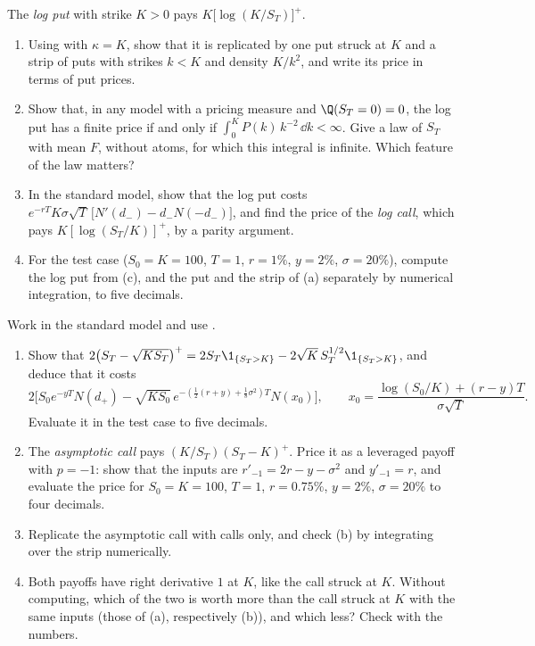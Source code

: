 \begin{exercise}\label{ex:sr-log-put}
\medium The \emph{log put} with strike $K>0$ pays $K\big[\log(K/S_T)\big]^+$.
\begin{enumerate}[label=(\alph*)]
  \item Using  with $\kappa=K$, show that it is replicated by one put struck at $K$ and
    a strip of puts with strikes $k<K$ and density $K/k^2$, and write its price in terms of put prices.
  \item Show that, in any model with a pricing measure and $\Q(S_T=0)=0$, the log put has a finite price if
    and only if $\int_0^KP(k)\,k^{-2}\,\dd k<\infty$. Give a law of $S_T$ with mean $F$, without atoms, for which
    this integral is infinite. Which feature of the law matters?
  \item In the standard model, show that the log put costs
    $e^{-rT}K\sigma\sqrt T\,\big[N'(d_-)-d_-N(-d_-)\big]$, and find the price of the \emph{log call}, which pays
    $K[\log(S_T/K)]^+$, by a parity argument.
  \item For the test case ($S_0=K=100$, $T=1$, $r=1\%$, $y=2\%$, $\sigma=20\%$), compute the log put from (c), and
    the put and the strip of (a) separately by numerical integration, to five decimals.
\end{enumerate}
\end{exercise}

\begin{exercise}\label{ex:sr-power-payoffs}
\medium Work in the standard model and use .
\begin{enumerate}[label=(\alph*)]
  \item Show that $2\big(S_T-\sqrt{KS_T}\big)^+=2S_T\1_{\{S_T>K\}}-2\sqrt K\,S_T^{1/2}\1_{\{S_T>K\}}$, and deduce that it costs
    \[
      2\Big[S_0e^{-yT}N(d_+)-\sqrt{KS_0}\,e^{-(\frac12(r+y)+\frac18\sigma^2)T}N(x_0)\Big],\qquad
      x_0=\frac{\log(S_0/K)+(r-y)T}{\sigma\sqrt T}.
    \]
    Evaluate it in the test case to five decimals.
  \item The \emph{asymptotic call} pays $(K/S_T)(S_T-K)^+$. Price it as a leveraged payoff with $p=-1$: show
    that the inputs are $r'_{-1}=2r-y-\sigma^2$ and $y'_{-1}=r$, and evaluate the price for $S_0=K=100$, $T=1$,
    $r=0.75\%$, $y=2\%$, $\sigma=20\%$ to four decimals.
  \item Replicate the asymptotic call with calls only, and check (b) by integrating over the strip numerically.
  \item Both payoffs have right derivative $1$ at $K$, like the call struck at $K$. Without computing, which of
    the two is worth more than the call struck at $K$ with the same inputs (those of (a), respectively (b)),
    and which less? Check with the numbers.
\end{enumerate}
\end{exercise}

